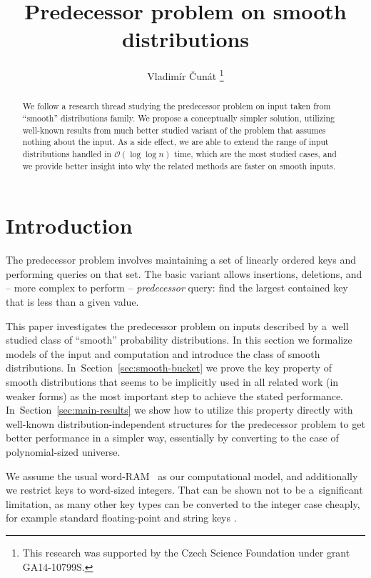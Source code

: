 \documentclass[
submission
]{dmtcs-episciences}
\title{Predecessor problem on smooth distributions}
\affiliation{
  Faculty of Mathematics and Physics, Charles University in Prague, Czech Republic \\
  CZ.NIC, z.\,s.\,p.\,o.
}
\author{Vladim\'ir \v{C}un\'at\affiliationmark{1,2}%
  \thanks{This research was supported by the Czech Science Foundation under grant GA14-10799S.}
}
\theoremstyle{plain}
\theoremstyle{definition}
\theoremstyle{remark}
\theoremstyle{plain}
\theoremstyle{plain}
\def\OO{\mathcal O}
\begin{document}
\maketitle

\begin{abstract}
We follow a research thread studying the predecessor problem on input
taken from ``smooth'' distributions family. We propose a conceptually
simpler solution, utilizing well-known results from much better studied
variant of the problem that assumes nothing about the input. As a
side effect, we are able to extend the range of input distributions
handled in $\OO\left(\log\log n\right)$ time, which are the most
studied cases, and we provide better insight into why the related
methods are faster on smooth inputs.
\end{abstract}




\section{Introduction \label{sec:defs}}

The predecessor problem involves maintaining a set of linearly
ordered keys and performing queries on that set. The basic variant allows insertions, deletions, and -- more complex to perform -- \emph{predecessor} query: find the largest contained key that is less than a given value. 

This paper investigates the predecessor problem on inputs described by  a~well studied class of ``smooth'' probability distributions. 
In this section we formalize models of the input and computation
and introduce the class of smooth distributions. In~Section~\ref{sec:smooth-bucket} we
prove the key property of smooth distributions that seems to be
implicitly used in all related work (in weaker forms) as the most
important step to achieve the stated performance. In~Section~\ref{sec:main-results}
we show how to utilize this property directly with well-known distribution-independent
structures for the predecessor problem to get better performance in
a simpler way, essentially by converting to the case of polynomial-sized
universe.

We assume the usual word-RAM~\cite{HagerupT98}
as our computational model, and additionally we restrict keys to word-sized
integers. That can be shown not to be a~significant limitation, as
many other key types can be converted to the integer case cheaply,
for example standard floating-point \cite[sec. 2.1.3]{Goldberg91}
and string keys \cite{AndersT01}.
\end{document}
